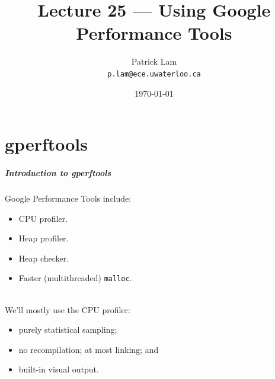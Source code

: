 

\title{Lecture 25 --- Using Google Performance Tools }

\author{Patrick Lam \\ \small \texttt{p.lam@ece.uwaterloo.ca}}
\date{\today}




\begin{frame}
  \titlepage

 \end{frame}


\part{gperftools}
\frame{\partpage}

\begin{frame}
  \frametitle{Introduction to gperftools}

  
    Google Performance Tools include:
      
      \begin{itemize}
        \item CPU profiler.
        \item Heap profiler.
        \item Heap checker.
        \item Faster (multithreaded) {\tt malloc}.
      \end{itemize}
~\\[1em]
     We'll mostly use the CPU profiler:
      \begin{itemize}
        \item purely statistical sampling;
        \item no recompilation; at most linking; and
        \item built-in visual output.
      \end{itemize}
  
\end{frame}

